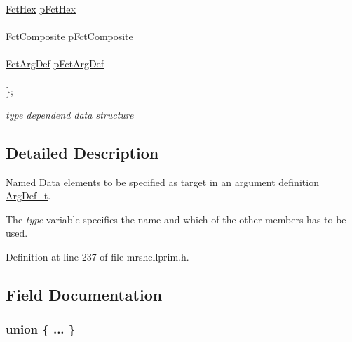 \begin{CompactItemize}
\begin{tabbing}
\>\\\>\hyperlink{mrshellprim_8h_7e40ba8c9e984665cfe0dbd2b4fa888a}{FctHex} \hyperlink{structTaggedData__t_2dd447060885b411cbf8a64170057b55}{pFctHex}\\
\>\\\>\hyperlink{mrshellprim_8h_fdf1e7a245d5ec6ac61d531e07e6a33c}{FctComposite} \hyperlink{structTaggedData__t_1d4925d2fd17d10226af14b97963366c}{pFctComposite}\\
\>\\\>\hyperlink{mrshellprim_8h_1c9f7567aaf5693ef8473ff91ccb8ff5}{FctArgDef} \hyperlink{structTaggedData__t_6a4dac68cc3f46afeb1c668dd7f0fdd8}{pFctArgDef}\\
\>\\\}; \\

\end{tabbing}\begin{CompactList}\small\item\em type dependend data structure \item\end{CompactList}\end{CompactItemize}


\subsection{Detailed Description}
Named Data elements to be specified as target in an argument definition \hyperlink{structArgDef__t}{Arg\-Def\_\-t}. 

The {\em type\/} variable specifies the name and which of the other members has to be used. 



Definition at line 237 of file mrshellprim.h.

\subsection{Field Documentation}
\hypertarget{structTaggedData__t_d4e407effddd9ce8f7a705ab396ac0c6}{
\subsubsection["@2]{\setlength{\rightskip}{0pt plus 5cm}union \{ ... \} }}
\label{structTaggedData__t_d4e407effddd9ce8f7a705ab396ac0c6}


